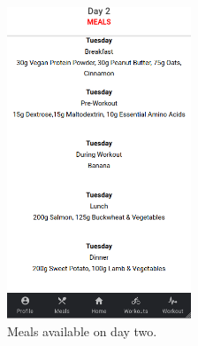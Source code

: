\documentclass[a4paper,12pt]{report}
\begin{document}
\begin{figure}[ht]
\begin{minipage}[b]{0.5\linewidth}
    \includegraphics[width=5.5cm, height=10.5cm\linewidth]{images/aplicationImages/meals.png} 
    \caption{Meals available on day two.} 
    \vspace{4ex}
  \end{minipage}
\end{figure}
\end{document}
